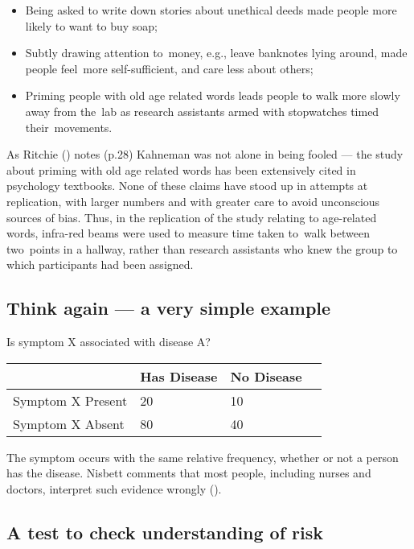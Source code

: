 \documentclass[
  10ptls,
  b5paper]{book}
\providecommand{\tightlist}{%
  \setlength{\itemsep}{0pt}\setlength{\parskip}{0pt}}
\begin{document}
\begin{itemize}
\tightlist
\item
  Being asked to write down stories about unethical deeds made people more likely to want to buy soap;
\item
  Subtly drawing attention to~money, e.g., leave banknotes lying around, made people feel~more self-sufficient, and care less about others;
\item
  Priming people with old age related words leads people to walk more slowly away from the~lab as research assistants armed with stopwatches timed their~movements.
\end{itemize}

As Ritchie () notes (p.28) Kahneman was not alone in being fooled --- the study about priming with old age related words has been extensively cited in psychology textbooks. None of these claims have stood up in attempts at replication, with larger numbers and with greater care to avoid unconscious sources of bias. Thus, in the replication of the study relating to age-related words, infra-red beams were used to measure time taken to~walk between two~points in a hallway, rather than research assistants who knew the group to which participants had been assigned.

\subsection*{Think again --- a very simple example}\label{think-again-a-very-simple-example}

Is symptom X associated with disease A?

\begin{longtable}[]{@{}llll@{}}
\toprule\noalign{}
& Has Disease & No Disease & \\
\midrule\noalign{}
\endhead
\bottomrule\noalign{}
\endlastfoot
Symptom X Present & 20 & 10 & \\
Symptom X Absent & 80 & 40 & \\
\end{longtable}

The symptom occurs with the same relative frequency, whether or not a person has the disease. Nisbett comments that most people, including nurses and doctors, interpret such evidence wrongly ().

\subsection*{A test to check understanding of risk}\label{a-test-to-check-understanding-of-risk}
\end{document}
